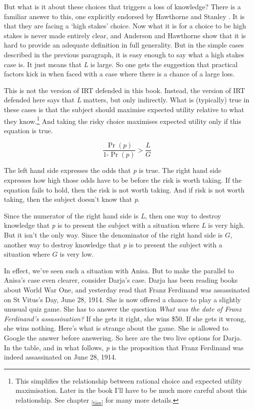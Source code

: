 \documentclass[
  11pt,
]{book}
\begin{document}
But what is it about these choices that triggers a loss of knowledge? There is a familiar answer to this, one explicitly endorsed by Hawthorne \citeyearpar{Hawthorne2004} and Stanley \citeyearpar{Stanley2005}. It is that they are facing a `high stakes' choice. Now what it is for a choice to be high stakes is never made entirely clear, and Anderson and Hawthorne \citeyearpar{AndersonHawthorne2019a} show that it is hard to provide an adequate definition in full generality. But in the simple cases described in the previous paragraph, it is easy enough to say what a high stakes case is. It just means that \emph{L} is large. So one gets the suggestion that practical factors kick in when faced with a case where there is a chance of a large loss.

This is not the version of IRT defended in this book. Instead, the version of IRT defended here says that \emph{L} matters, but only indirectly. What is (typically) true in these cases is that the subject should maximise expected utility relative to what they know.\footnote{This simplifies the relationship between rational choice and expected utility maximisation. Later in the book I'll have to be much more careful about this relationship. See chapter \textsubscript{\ref{ties}} for many more details.} And taking the risky choice maximises expected utility only if this equation is true.

\[
\frac{\Pr(p)}{1 ‑ \Pr(p)} > \frac{L}{G}
\]

The left hand side expresses the odds that \emph{p} is true. The right hand side expresses how high those odds have to be before the risk is worth taking. If the equation fails to hold, then the risk is not worth taking. And if risk is not worth taking, then the subject doesn't know that \emph{p}.

Since the numerator of the right hand side is \emph{L}, then one way to destroy knowledge that \emph{p} is to present the subject with a situation where \emph{L} is very high. But it isn't the only way. Since the denominator of the right hand side is \(G\), another way to destroy knowledge that \emph{p} is to present the subject with a situation where \(G\) is very low.

In effect, we've seen such a situation with Anisa. But to make the parallel to Anisa's case even clearer, consider Darja's case. Darja has been reading books about World War One, and yesterday read that Franz Ferdinand was assassinated on St Vitus's Day, June 28, 1914. She is now offered a chance to play a slightly unusual quiz game. She has to answer the question \emph{What was the date of Franz Ferdinand's assassination?} If she gets it right, she wins \$50. If she gets it wrong, she wins nothing. Here's what is strange about the game. She is allowed to Google the answer before answering. So here are the two live options for Darja. In the table, and in what follows, \emph{p} is the proposition that Franz Ferdinand was indeed assassinated on June 28, 1914.
\end{document}
